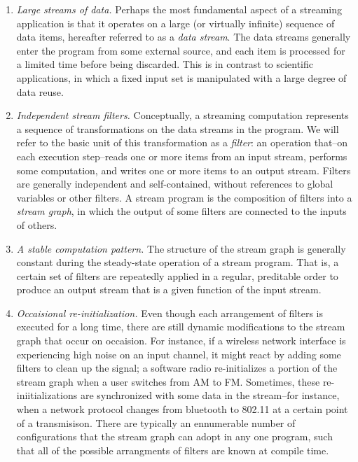 \begin{enumerate}

\item {\it Large streams of data.}  Perhaps the most fundamental
aspect of a streaming application is that it operates on a large (or
virtually infinite) sequence of data items, hereafter referred to as a
{\it data stream}.  The data streams generally enter the program from
some external source, and each item is processed for a limited time
before being discarded.  This is in contrast to scientific
applications, in which a fixed input set is manipulated with a large
degree of data reuse.

\item {\it Independent stream filters.}  Conceptually, a streaming computation
represents a sequence of transformations on the data streams in the
program.  We will refer to the basic unit of this transformation as a
{\it filter}: an operation that--on each execution step--reads one or
more items from an input stream, performs some computation, and writes
one or more items to an output stream.  Filters are generally
independent and self-contained, without references to global variables
or other filters.  A stream program is the composition of filters into
a {\it stream graph}, in which the output of some filters are
connected to the inputs of others.

\item {\it A stable computation pattern.}  The structure of the stream
graph is generally constant during the steady-state operation of a
stream program.  That is, a certain set of filters are repeatedly
applied in a regular, preditable order to produce an output stream
that is a given function of the input stream.

\item {\it Occaisional re-initialization.}  Even though each
arrangement of filters is executed for a long time, there are still
dynamic modifications to the stream graph that occur on occaision.
For instance, if a wireless network interface is experiencing high
noise on an input channel, it might react by adding some filters to
clean up the signal; a software radio re-initializes a portion of the
stream graph when a user switches from AM to FM.  Sometimes, these
re-iniitializations are synchronized with some data in the stream--for
instance, when a network protocol changes from bluetooth to 802.11 at
a certain point of a transmisison.  There are typically an ennumerable
number of configurations that the stream graph can adopt in any one
program, such that all of the possible arrangments of filters are
known at compile time.


\end{enumerate}
